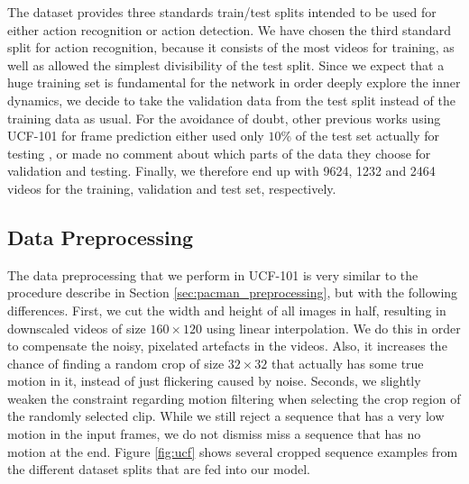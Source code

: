 The dataset provides three standards train/test splits intended to be used for either action recognition or action detection. We have chosen the third standard split for action recognition, because it consists of the most videos for training, as well as allowed the simplest divisibility of the test split. Since we expect that a huge training set is fundamental for the network in order deeply explore the inner dynamics, we decide to take the validation data from the test split instead of the training data as usual. For the avoidance of doubt, other previous works using UCF-101 for frame prediction either used only $ 10\% $ of the test set actually for testing \parencite[p. 12]{deep_multiscale_video_pred}, or made no comment about which parts of the data they choose for validation and testing. Finally, we therefore end up with \num{9624}, \num{1232} and \num{2464} videos for the training, validation and test set, respectively.


\subsection{Data Preprocessing}

The data preprocessing that we perform in UCF-101 is very similar to the procedure describe in Section \ref{sec:pacman_preprocessing}, but with the following differences. First, we cut the width and height of all images in half, resulting in downscaled videos of size $160 \times 120$ using linear interpolation. We do this in order to compensate the noisy, pixelated artefacts in the videos. Also, it increases the chance of finding a random crop of size $ 32 \times 32 $ that actually has some true motion in it, instead of just flickering caused by noise. Seconds, we slightly weaken the constraint regarding motion filtering when selecting the crop region of the randomly selected clip. While we still reject a sequence that has a very low motion in the input frames, we do not dismiss miss a sequence that has no motion at the end. Figure \ref{fig:ucf} shows several cropped sequence examples from the different dataset splits that are fed into our model.


